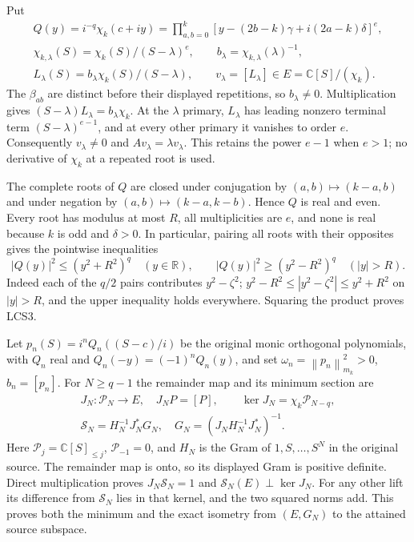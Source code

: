 \documentclass[11pt]{article}
\newcommand{\C}{\mathbb C}\newcommand{\R}{\mathbb R}
\newcommand{\PP}{\mathcal P}
\newcommand{\norm}[1]{\left\lVert#1\right\rVert}
\begin{document}
Put
\begin{equation}\tag{LCS2}
\begin{gathered}
 Q(y)=i^{-q}\chi_k(c+iy)
   =\prod_{a,b=0}^k
      [y-(2b-k)\gamma+i(2a-k)\delta]^e,\\
 \chi_{k,\lambda}(S)=\chi_k(S)/(S-\lambda)^e,\qquad
 b_\lambda=\chi_{k,\lambda}(\lambda)^{-1},\\
 L_\lambda(S)=b_\lambda\chi_k(S)/(S-\lambda),\qquad
 v_\lambda=[L_\lambda]\in E=\C[S]/(\chi_k).
\end{gathered}
\end{equation}
The $\beta_{ab}$ are distinct before their displayed repetitions, so
$b_\lambda\ne0$. Multiplication gives
$(S-\lambda)L_\lambda=b_\lambda\chi_k$. At the $\lambda$ primary,
$L_\lambda$ has leading nonzero terminal term
$(S-\lambda)^{e-1}$, and at every other primary it vanishes to order
$e$. Consequently $v_\lambda\ne0$ and $Av_\lambda=\lambda v_\lambda$.
This retains the power $e-1$ when $e>1$; no derivative of $\chi_k$ at
a repeated root is used.

The complete roots of $Q$ are closed under conjugation by
$(a,b)\mapsto(k-a,b)$ and under negation by
$(a,b)\mapsto(k-a,k-b)$. Hence $Q$ is real and even. Every root has
modulus at most $R$, all multiplicities are $e$, and none is real
because $k$ is odd and $\delta>0$. In particular, pairing all roots
with their opposites gives the pointwise inequalities
\begin{equation}\tag{LCS3}
 |Q(y)|^2\le(y^2+R^2)^q\quad(y\in\R),\qquad
 |Q(y)|^2\ge(y^2-R^2)^q\quad(|y|>R).
\end{equation}
Indeed each of the $q/2$ pairs contributes $y^2-\zeta^2$;
$y^2-R^2\le|y^2-\zeta^2|\le y^2+R^2$ on $|y|>R$, and the upper
inequality holds everywhere. Squaring the product proves LCS3.

Let $p_n(S)=i^nQ_n((S-c)/i)$ be the original monic orthogonal
polynomials, with $Q_n$ real and
$Q_n(-y)=(-1)^nQ_n(y)$, and set
$\omega_n=\norm{p_n}_{m_k}^2>0$, $b_n=[p_n]$.
For $N\ge q-1$ the remainder map and its minimum section are
\begin{equation}\tag{LCS4}
\begin{gathered}
 J_N:\PP_N\longrightarrow E,\quad J_NP=[P],\qquad
 \ker J_N=\chi_k\PP_{N-q},\\
 \mathscr S_N=H_N^{-1}J_N^*G_N,\quad
 G_N=(J_NH_N^{-1}J_N^*)^{-1}.
\end{gathered}
\end{equation}
Here $\PP_j=\C[S]_{\le j}$, $\PP_{-1}=0$, and $H_N$ is the
Gram of $1,S,\ldots,S^N$ in the original source. The remainder map
is onto, so its displayed Gram is positive definite. Direct
multiplication proves $J_N\mathscr S_N=1$ and
$\mathscr S_N(E)\perp\ker J_N$. For any other lift its difference
from $\mathscr S_N$ lies in that kernel, and the two squared norms
add. This proves both the minimum and the exact isometry from
$(E,G_N)$ to the attained source subspace.
\end{document}
